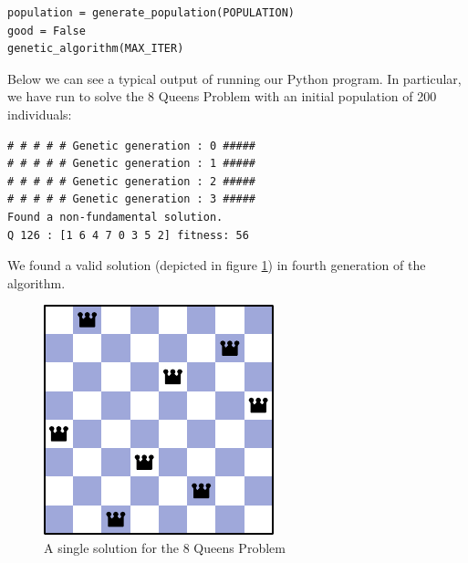 \begin{lstlisting}[label=sn:main, caption=Instructions needed to perform the Genetic Algorithm]
population = generate_population(POPULATION)
good = False
genetic_algorithm(MAX_ITER)
\end{lstlisting}

Below we can see a typical output of running our Python program. In particular, we have run  to solve the 8 Queens Problem with an initial population of 200 individuals:
\renewcommand{\lstlistingname}{Snippet}
\begin{lstlisting}[style=output, label=out:n-queens8-200]
# # # # # Genetic generation : 0 #####
# # # # # Genetic generation : 1 #####
# # # # # Genetic generation : 2 #####
# # # # # Genetic generation : 3 #####
Found a non-fundamental solution.
Q 126 : [1 6 4 7 0 3 5 2] fitness: 56
\end{lstlisting}

We found a valid solution (depicted in figure \ref{fig:8queens-example}) in fourth generation of the algorithm.
\begin{figure}[H]
	\centering
	\includegraphics[height=0.36\textwidth]{images/8queens-example}
	\caption{A single solution for the 8 Queens Problem}
	\label{fig:8queens-example}
\end{figure}
